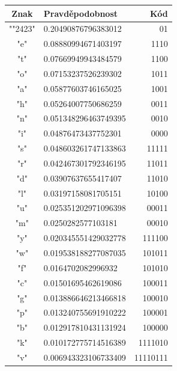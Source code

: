 \documentclass[12pt]{article}
\def\textvisiblespace{{\TVSp\char"2423}}
\begin{document}
\begin{table}[!ht]
\centering
\begin{tabular}{ | c | l | r | } \hline
Znak    &       Pravděpodobnost &       Kód     \\ \hline
"\textvisiblespace "     &       0.20490876796383012     &       01      \\ \hline
"e"     &       0.08880994671403197     &       1110    \\ \hline
"t"     &       0.07669949943484579     &       1100    \\ \hline
"o"     &       0.07153237526239302     &       1011    \\ \hline
"a"     &       0.05877603746165025     &       1001    \\ \hline
"h"     &       0.05264007750686259     &       0011    \\ \hline
"n"     &       0.051348296463749395    &       0010    \\ \hline
"i"     &       0.04876473437752301     &       0000    \\ \hline
"s"     &       0.048603261747133863    &       11111   \\ \hline
"r"     &       0.042467301792346195    &       11011   \\ \hline
"d"     &       0.03907637655417407     &       11010   \\ \hline
"l"     &       0.03197158081705151     &       10100   \\ \hline
"u"     &       0.025351202971096398    &       00011   \\ \hline
"m"     &       0.0250282577103181      &       00010   \\ \hline
"y"     &       0.020345551429032778    &       111100  \\ \hline
"w"     &       0.019538188277087035    &       101011  \\ \hline
"f"     &       0.0164702082996932      &       101010  \\ \hline
"c"     &       0.01501695462619086     &       100011  \\ \hline
"g"     &       0.013886646213466818    &       100010  \\ \hline
"p"     &       0.013240755691910222    &       100001  \\ \hline
"b"     &       0.012917810431131924    &       100000  \\ \hline
"k"     &       0.010172775714516389    &       1111010 \\ \hline
"v"     &       0.006943323106733409    &       11110111        \\ \hline

\end{tabular}
\end{table}
\end{document}
